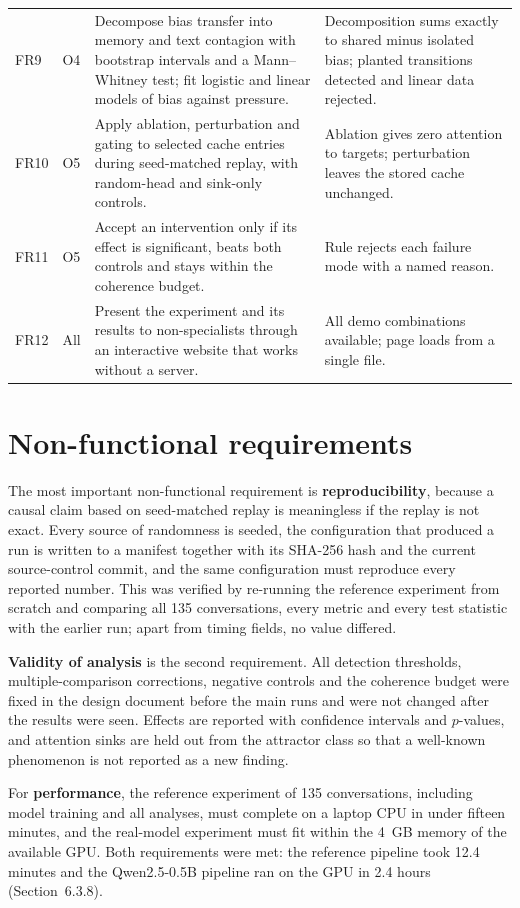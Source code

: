 \begin{longtable}{@{}L{1.0cm}L{1.0cm}L{6.2cm}L{5.8cm}@{}}
FR9 & O4 & Decompose bias transfer into memory and text contagion with bootstrap intervals and a Mann--Whitney test; fit logistic and linear models of bias against pressure. & Decomposition sums exactly to shared minus isolated bias; planted transitions detected and linear data rejected. \\
FR10 & O5 & Apply ablation, perturbation and gating to selected cache entries during seed-matched replay, with random-head and sink-only controls. & Ablation gives zero attention to targets; perturbation leaves the stored cache unchanged. \\
FR11 & O5 & Accept an intervention only if its effect is significant, beats both controls and stays within the coherence budget. & Rule rejects each failure mode with a named reason. \\
FR12 & All & Present the experiment and its results to non-specialists through an interactive website that works without a server. & All demo combinations available; page loads from a single file. \\
\bottomrule
\end{longtable}

\section{Non-functional requirements}
The most important non-functional requirement is \textbf{reproducibility}, because a causal claim based on seed-matched replay is meaningless if the replay is not exact. Every source of randomness is seeded, the configuration that produced a run is written to a manifest together with its SHA-256 hash and the current source-control commit, and the same configuration must reproduce every reported number. This was verified by re-running the reference experiment from scratch and comparing all 135 conversations, every metric and every test statistic with the earlier run; apart from timing fields, no value differed.

\textbf{Validity of analysis} is the second requirement. All detection thresholds, multiple-comparison corrections, negative controls and the coherence budget were fixed in the design document before the main runs and were not changed after the results were seen. Effects are reported with confidence intervals and $p$-values, and attention sinks are held out from the attractor class so that a well-known phenomenon is not reported as a new finding.

For \textbf{performance}, the reference experiment of 135 conversations, including model training and all analyses, must complete on a laptop CPU in under fifteen minutes, and the real-model experiment must fit within the 4~GB memory of the available GPU. Both requirements were met: the reference pipeline took 12.4 minutes and the Qwen2.5-0.5B pipeline ran on the GPU in 2.4 hours (Section~6.3.8).

